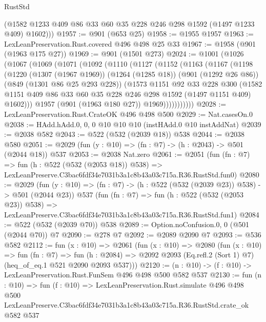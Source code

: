 \begin{lexlean}{RustStd}
\begin{coremodule}
        (@1582 @1233 @409 @86 @33 @60 @35 @228 @246 @298 @1592 (@1497 @1233 @409) @1602)))
@1957 := @901 (@653 @25)
@1958 := @1955 @1957
@1963 := LexLeanPreservation.Rust.covered @496 @498 @25 @33
@1967 := @1958 (@901 (@1963 @175 @27))
@1969 := @901 (@1501 @273)
@2024 := @1001
    (@1026
      (@1067
        (@1069
          (@1071
            (@1092
              (@1110
                (@1127
                  (@1152
                    (@1163
                      (@1167
                        (@1198
                          (@1220
                            (@1307 (@1967 @1969))
                            (@1264 (@1285 @18))
                            (@901 (@1292 @26 @86))
                            (@849 (@1301 @86 @25 @293 @228))
                            (@1573
                              @1151
                              @92
                              @33
                              @228
                              @300
                              (@1582
                                @1151
                                @409
                                @86
                                @33
                                @60
                                @35
                                @228
                                @246
                                @298
                                @1592
                                (@1497 @1151 @409)
                                @1602)))
                          @1957
                          (@901 (@1963 @180 @27))
                          @1969)))))))))))
@2028 := LexLeanPreservation.Rust.CrateOK @496 @498 @500
@2029 := Nat.casesOn.{0}
@2038 := HAdd.hAdd.{0, 0, 0} @10 @10 @10 (instHAdd.{0} @10 instAddNat)
@2039 := @2038 @582
@2043 := @522 (@532 (@2039 @18)) @538
@2044 := @2038 @580
@2051 := @2029 (fun (y : @10) => (fn : @7) -> (h : @2043) -> @501 (@2044 @18)) @537
@2053 := @2038 Nat.zero
@2061 := @2051
    (fun (fn : @7) =>
    fun (h : @522 (@532 (@2053 @18)) @538) =>
    LexLeanPreserve.C3bac6fdf34e7031b3a1c8b43a03c715a.R36.RustStd.fun0)
@2080 := @2029
    (fun (y : @10) => (fn : @7) -> (h : @522 (@532 (@2039 @23)) @538) -> @501 (@2044 @23))
    @537
    (fun (fn : @7) =>
    fun (h : @522 (@532 (@2053 @23)) @538) =>
    LexLeanPreserve.C3bac6fdf34e7031b3a1c8b43a03c715a.R36.RustStd.fun1)
@2084 := @522 (@532 (@2039 @70)) @538
@2089 := Option.noConfusion.{0, 0} (@501 (@2044 @70)) @7
@2090 := @278 @7
@2092 := @2089 @2090 @7
@2093 := @536 @582
@2112 := fun (x : @10) =>
  @2061
    (fun (x : @10) =>
    @2080
      (fun (x : @10) =>
      fun (fn : @7) =>
      fun (h : @2084) =>
      @2092 @2093 (Eq.refl.{2} (Sort 1) @7) (heq_of_eq.{1} @521 @2090 @2093 @537)))
@2120 := (n : @10) -> (f : @10) -> LexLeanPreservation.Rust.FunSem @496 @498 @500 @582 @537
@2130 := fun (n : @10) =>
  fun (f : @10) =>
  LexLeanPreservation.Rust.simulate
    @496
    @498
    @500
    LexLeanPreserve.C3bac6fdf34e7031b3a1c8b43a03c715a.R36.RustStd.crate_ok
    @582
    @537
\end{coremodule}
\end{lexlean}
